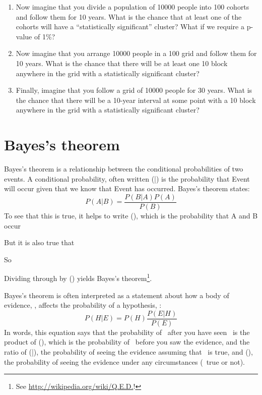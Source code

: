 \documentclass[12pt]{book}
\begin{document}
\begin{exercise}
\begin{enumerate}
\item Now imagine that you divide a population of 10000 people into 100
  cohorts and follow them for 10 years.  What is the chance that at
  least one of the cohorts will have a ``statistically significant''
  cluster?  What if we require a p-value of 1\%?

\item Now imagine that you arrange 10000 people in a 100 
  grid and follow them for 10 years.  What is the chance that there
  will be at least one 10  block anywhere in the grid
  with a statistically significant cluster?

\item Finally, imagine that you follow a grid of 10000 people for 30
  years.  What is the chance that there will be a 10-year interval
  at some point with a 10  block anywhere in the grid
  with a statistically significant cluster?

\end{enumerate}

\end{exercise}



\section{Bayes's theorem}

Bayes's theorem is a relationship between the conditional probabilities
of two events.  A conditional probability, often written \Prob(\A|\B) is
the probability that Event \A will occur given that we know that
Event \B has occurred.  Bayes's theorem states:
%
\[ P(A|B) = \frac{P(B|A)P(A)}{P(B)} \]
%
To see that this is true, it helps to write \Prob(\A \AND \B), which
is the probability that A and B occur

\Eqn{ \Prob(\A \AND \B) = \Prob(\A) \Prob(\B|\A) }

But it is also true that 

\Eqn{ \Prob(\A \AND \B) = \Prob(\B) \Prob(\A|\B) }

So

\Eqn{ \Prob(\B) \Prob(\A|\B) = \Prob(\A) \Prob(\B|\A) }

Dividing through by \Prob(\B) yields Bayes's theorem\footnote{See
\url{http://wikipedia.org/wiki/Q.E.D.}!}.

Bayes's theorem is often interpreted as a statement about 
how a body of evidence, \E, affects the probability of a 
hypothesis, \HH:
%
\[ P(H|E) = P(H) \frac{P(E|H)}{P(E)} \]
%
In words, this equation says that the probability of \HH~after you
have seen \E~is the product of \Prob(\HH), which is the probability of
\HH~before you saw the evidence, and the ratio of \Prob(\E|\HH), the
probability of seeing the evidence assuming that \HH~is true, and
\Prob(\E), the probability of seeing the evidence under any circumstances
(\HH~true or not).
\end{document}
